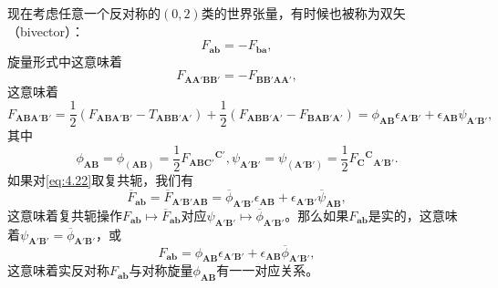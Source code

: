 现在考虑任意一个反对称的$( 0,2)$类的世界张量，有时候也被称为双矢（bivector）：
\begin{equation*}
	F_{\boldsymbol{ab}} =-F_{\boldsymbol{ba}} ,
\end{equation*}
旋量形式中这意味着
\begin{equation*}
	F_{\boldsymbol{AA} '\boldsymbol{BB} '} =-F_{\boldsymbol{BB} '\boldsymbol{AA} '} ,
\end{equation*}
这意味着
\begin{equation}
	F_{\boldsymbol{ABA} '\boldsymbol{B} '} =\frac{1}{2}( F_{\boldsymbol{ABA} '\boldsymbol{B} '} -T_{\boldsymbol{ABB} '\boldsymbol{A} '}) +\frac{1}{2}( F_{\boldsymbol{ABB} '\boldsymbol{A} '} -F_{\boldsymbol{BAB} '\boldsymbol{A} '}) =\phi _{\boldsymbol{AB}} \epsilon _{\boldsymbol{A'B} '} +\epsilon _{\boldsymbol{AB}} \psi _{\boldsymbol{A} '\boldsymbol{B} '} ,
	\label{eq:4.22}
\end{equation}
其中
\begin{equation*}
	\phi _{\boldsymbol{AB}} =\phi _{(\boldsymbol{AB})} =\frac{1}{2} F{_{\boldsymbol{ABC} '}}^{\boldsymbol{C} '} ,\psi _{\boldsymbol{A} '\boldsymbol{B} '} =\psi _{(\boldsymbol{A} '\boldsymbol{B} ')} =\frac{1}{2} F{_{\boldsymbol{C}}}^{\boldsymbol{C}}{}_{\boldsymbol{A} '\boldsymbol{B} '} .
\end{equation*}
如果对\ref{eq:4.22}取复共轭，我们有
\begin{equation*}
	\overline{F}_{\boldsymbol{ab}} =\overline{F}_{\boldsymbol{A} '\boldsymbol{B} '\boldsymbol{AB}} =\overline{\phi }_{\boldsymbol{A} '\boldsymbol{B} '} \epsilon _{\boldsymbol{AB}} +\epsilon _{\boldsymbol{A} '\boldsymbol{B} '}\overline{\psi }_{\boldsymbol{AB}} ,
\end{equation*}
这意味着复共轭操作$F_{\boldsymbol{ab}} \mapsto \overline{F}_{\boldsymbol{ab}}$对应$\psi _{\boldsymbol{A} '\boldsymbol{B} '} \mapsto \overline{\phi }_{\boldsymbol{A} '\boldsymbol{B} '}$。那么如果$F_{\boldsymbol{ab}}$是实的，这意味着$\psi _{\boldsymbol{A} '\boldsymbol{B} '} =\overline{\phi }_{\boldsymbol{A} '\boldsymbol{B} '}$，或
\begin{equation}
	F_{\boldsymbol{ab}} =\phi _{\boldsymbol{AB}} \epsilon _{\boldsymbol{A'B} '} +\epsilon _{\boldsymbol{AB}}\overline{\phi }_{\boldsymbol{A} '\boldsymbol{B} '} ,
	\label{eq:4.23}
\end{equation}
这意味着实反对称$F_{\boldsymbol{ab}}$与对称旋量$\phi _{\boldsymbol{AB}}$有一一对应关系。



